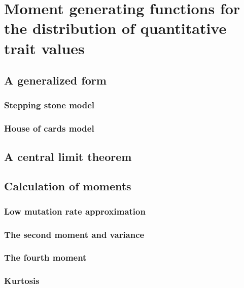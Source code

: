 \documentclass{article}
\begin{document}
\section{Moment generating functions for the distribution of quantitative trait values}
\subsection{A generalized form}
\subsubsection{Stepping stone model}

\subsubsection{House of cards model}

\subsection{A central limit theorem}

\subsection{Calculation of moments}
\subsubsection{Low mutation rate approximation}

\subsubsection{The second moment and variance}

\subsubsection{The fourth moment}

\subsubsection{Kurtosis}

\end{document}
